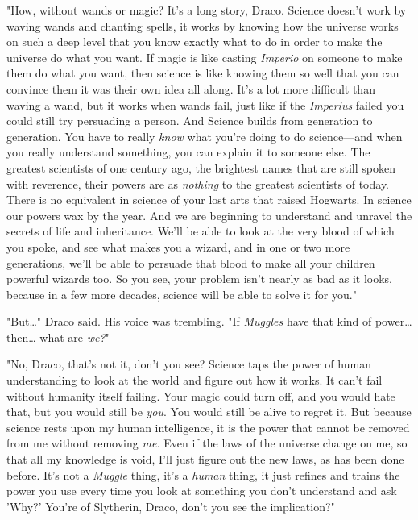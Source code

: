 "How, without wands or magic? It's a long story, Draco. Science doesn't work by 
waving wands and chanting spells, it works by knowing how the universe works on 
such a deep level that you know exactly what to do in order to make the 
universe do what you want. If magic is like casting \emph{Imperio} on someone 
to make them do what you want, then science is like knowing them so well that 
you can convince them it was their own idea all along. It's a lot more 
difficult than waving a wand, but it works when wands fail, just like if the 
\emph{Imperius} failed you could still try persuading a person. And Science 
builds from generation to generation. You have to really \emph{know} what 
you're doing to do science---and when you really understand something, you can 
explain it to someone else. The greatest scientists of one century ago, the 
brightest names that are still spoken with reverence, their powers are as 
\emph{nothing} to the greatest scientists of today. There is no equivalent in 
science of your lost arts that raised Hogwarts. In science our powers wax by 
the year. And we are beginning to understand and unravel the secrets of life 
and inheritance. We'll be able to look at the very blood of which you spoke, 
and see what makes you a wizard, and in one or two more generations, we'll be 
able to persuade that blood to make all your children powerful wizards too. So 
you see, your problem isn't nearly as bad as it looks, because in a few more 
decades, science will be able to solve it for you."

"But{\ldots}" Draco said. His voice was trembling. "If \emph{Muggles} have that 
kind of power{\ldots} then{\ldots} what are \emph{we?}"

"No, Draco, that's not it, don't you see? Science taps the power of human 
understanding to look at the world and figure out how it works. It can't fail 
without humanity itself failing. Your magic could turn off, and you would hate 
that, but you would still be \emph{you}. You would still be alive to regret it. 
But because science rests upon my human intelligence, it is the power that 
cannot be removed from me without removing \emph{me.} Even if the laws of the 
universe change on me, so that all my knowledge is void, I'll just figure out 
the new laws, as has been done before. It's not a \emph{Muggle} thing, it's a 
\emph{human} thing, it just refines and trains the power you use every time you 
look at something you don't understand and ask 'Why?' You're of Slytherin, 
Draco, don't you see the implication?"

